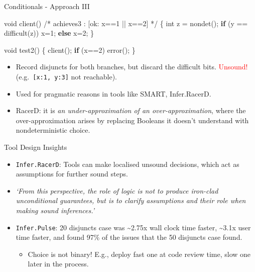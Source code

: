 \documentclass[
  10pt,
  ignorenonframetext,
]{beamer}
\newenvironment{Shaded}{\begin{snugshade}}{\end{snugshade}}
\newcommand{\CommentTok}[1]{\textcolor[rgb]{0.48,0.49,0.49}{#1}}
\newcommand{\ControlFlowTok}[1]{\textcolor[rgb]{0.99,0.74,0.29}{\textbf{#1}}}
\newcommand{\DataTypeTok}[1]{\textcolor[rgb]{0.16,0.50,0.73}{#1}}
\newcommand{\DecValTok}[1]{\textcolor[rgb]{0.96,0.45,0.00}{#1}}
\newcommand{\NormalTok}[1]{\textcolor[rgb]{0.81,0.81,0.76}{#1}}
\newcommand{\OperatorTok}[1]{\textcolor[rgb]{0.81,0.81,0.76}{#1}}
\providecommand{\tightlist}{%
  \setlength{\itemsep}{0pt}\setlength{\parskip}{0pt}}
\newcommand{\red}[1]{\textcolor{red}{#1}}
\begin{document}
\begin{frame}[fragile]{Conditionals - Approach III}
\label{conditionals---approach-iii}
\begin{Shaded}
\begin{Highlighting}[]
\DataTypeTok{void}\NormalTok{ client}\OperatorTok{()}
\CommentTok{/* achieves3 : [ok: x==1 || x==2] */}
\OperatorTok{\{}   \DataTypeTok{int}\NormalTok{ z }\OperatorTok{=}\NormalTok{ nondet}\OperatorTok{();}
    \ControlFlowTok{if} \OperatorTok{(}\NormalTok{y }\OperatorTok{==}\NormalTok{ difficult}\OperatorTok{(}\NormalTok{z}\OperatorTok{))}
\NormalTok{        x}\OperatorTok{=}\DecValTok{1}\OperatorTok{;}
    \ControlFlowTok{else}
\NormalTok{        x}\OperatorTok{=}\DecValTok{2}\OperatorTok{;}
\OperatorTok{\}}

\DataTypeTok{void}\NormalTok{ test2}\OperatorTok{()}
\OperatorTok{\{}\NormalTok{   client}\OperatorTok{();} \ControlFlowTok{if} \OperatorTok{(}\NormalTok{x}\OperatorTok{==}\DecValTok{2}\OperatorTok{)}\NormalTok{ error}\OperatorTok{();} \OperatorTok{\}}
\end{Highlighting}
\end{Shaded}

\begin{itemize}
\item
  Record disjuncts for both branches, but discard the difficult bits.
  \red{Unsound!} (e.g.~\texttt{{[}x:1,\ y:3{]}} not reachable).
\item
  Used for pragmatic reasons in tools like SMART, Infer.RacerD.
\item
  RacerD: it is \emph{an under-approximation of an over-approximation},
  where the over-approximation arises by replacing Booleans it doesn't
  understand with nondeterministic choice.
\end{itemize}
\end{frame}

\begin{frame}[fragile]{Tool Design Insights}
\label{tool-design-insights}
\begin{itemize}
\item
  \texttt{Infer.RacerD}: Tools can make localised unsound decisions,
  which act as assumptions for further sound steps.
\item
  \emph{`From this perspective, the role of logic is not to produce
  iron-clad unconditional guarantees, but is to clarify assumptions and
  their role when making sound inferences.'}
\item
  \texttt{Infer.Pulse}: 20 disjuncts case was \textasciitilde2.75x wall
  clock time faster, \textasciitilde3.1x user time faster, and found
  97\% of the issues that the 50 disjuncts case found.

  \begin{itemize}
  \tightlist
  \item
    Choice is not binary! E.g., deploy fast one at code review time,
    slow one later in the process.
  \end{itemize}
\end{itemize}
\end{frame}
\end{document}
